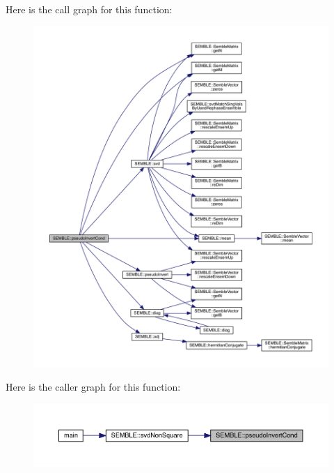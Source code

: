 Here is the call graph for this function\+:
\nopagebreak
\begin{figure}[H]
\begin{center}
\leavevmode
\includegraphics[width=350pt]{d7/dfd/namespaceSEMBLE_ad26b9b7468ab7482dfcd5909c46358cf_cgraph}
\end{center}
\end{figure}
Here is the caller graph for this function\+:
\nopagebreak
\begin{figure}[H]
\begin{center}
\leavevmode
\includegraphics[width=350pt]{d7/dfd/namespaceSEMBLE_ad26b9b7468ab7482dfcd5909c46358cf_icgraph}
\end{center}
\end{figure}
\mbox{\label{namespaceSEMBLE_aeba19d69ca776dd563e7ccb9975fa4c7}} 
